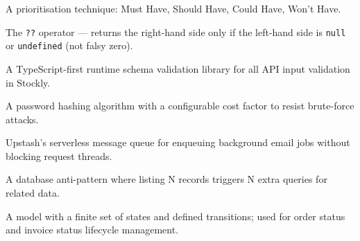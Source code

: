 \documentclass[12pt,a4paper]{report}
\begin{document}
\begin{description}[leftmargin=3cm, style=nextline]
    \item[MoSCoW] A prioritisation technique: Must Have, Should Have, Could Have, Won't Have.
    \item[Nullish Coalescing] The \texttt{??} operator --- returns the right-hand side only if the left-hand side is \texttt{null} or \texttt{undefined} (not falsy zero).
    \item[Zod] A TypeScript-first runtime schema validation library for all API input validation in Stockly.
    \item[bcrypt] A password hashing algorithm with a configurable cost factor to resist brute-force attacks.
    \item[QStash] Upstash's serverless message queue for enqueuing background email jobs without blocking request threads.
    \item[N+1 Problem] A database anti-pattern where listing N records triggers N extra queries for related data.
    \item[State Machine] A model with a finite set of states and defined transitions; used for order status and invoice status lifecycle management.
\end{description}
\end{document}
